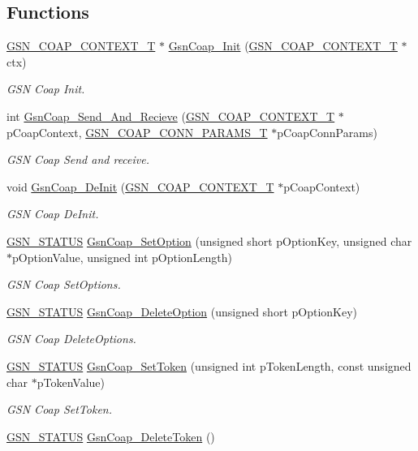\subsection*{Functions}
\begin{DoxyCompactItemize}
\item 
\hyperlink{a00479_ab529666f5a53e57a0760df584886eb5b}{GSN\_\-COAP\_\-CONTEXT\_\-T} $\ast$ \hyperlink{a00478_a940ab24193f2092f04089c84e3a93bbb}{GsnCoap\_\-Init} (\hyperlink{a00479_ab529666f5a53e57a0760df584886eb5b}{GSN\_\-COAP\_\-CONTEXT\_\-T} $\ast$ctx)
\begin{DoxyCompactList}\small\item\em GSN Coap Init. \end{DoxyCompactList}\item 
int \hyperlink{a00478_ae817954f9719fe38e7f16d85984c6667}{GsnCoap\_\-Send\_\-And\_\-Recieve} (\hyperlink{a00479_ab529666f5a53e57a0760df584886eb5b}{GSN\_\-COAP\_\-CONTEXT\_\-T} $\ast$pCoapContext, \hyperlink{a00040}{GSN\_\-COAP\_\-CONN\_\-PARAMS\_\-T} $\ast$pCoapConnParams)
\begin{DoxyCompactList}\small\item\em GSN Coap Send and receive. \end{DoxyCompactList}\item 
void \hyperlink{a00478_a36b2055baa9f705151821d5cf4c444f3}{GsnCoap\_\-DeInit} (\hyperlink{a00479_ab529666f5a53e57a0760df584886eb5b}{GSN\_\-COAP\_\-CONTEXT\_\-T} $\ast$pCoapContext)
\begin{DoxyCompactList}\small\item\em GSN Coap DeInit. \end{DoxyCompactList}\item 
\hyperlink{a00660_gada5951904ac6110b1fa95e51a9ddc217}{GSN\_\-STATUS} \hyperlink{a00478_ad15202d9d881e4ccb3bbee63ccaf5e57}{GsnCoap\_\-SetOption} (unsigned short pOptionKey, unsigned char $\ast$pOptionValue, unsigned int pOptionLength)
\begin{DoxyCompactList}\small\item\em GSN Coap SetOptions. \end{DoxyCompactList}\item 
\hyperlink{a00660_gada5951904ac6110b1fa95e51a9ddc217}{GSN\_\-STATUS} \hyperlink{a00478_a9ddeeae764c131a2b9193caa33206d34}{GsnCoap\_\-DeleteOption} (unsigned short pOptionKey)
\begin{DoxyCompactList}\small\item\em GSN Coap DeleteOptions. \end{DoxyCompactList}\item 
\hyperlink{a00660_gada5951904ac6110b1fa95e51a9ddc217}{GSN\_\-STATUS} \hyperlink{a00478_a09d54eefadd75ffec2f21a75d7c09e46}{GsnCoap\_\-SetToken} (unsigned int pTokenLength, const unsigned char $\ast$pTokenValue)
\begin{DoxyCompactList}\small\item\em GSN Coap SetToken. \end{DoxyCompactList}\item 
\hyperlink{a00660_gada5951904ac6110b1fa95e51a9ddc217}{GSN\_\-STATUS} \hyperlink{a00478_a31fc74a6754e04f80e088c5c156748f1}{GsnCoap\_\-DeleteToken} ()
\end{DoxyCompactItemize}


